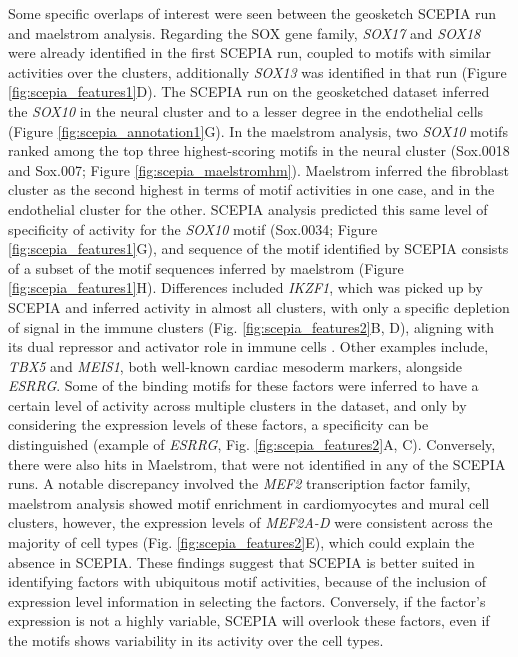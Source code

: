 Some specific overlaps of interest were seen between the geosketch SCEPIA run and maelstrom analysis. Regarding the SOX gene family,  \textit{SOX17} and \textit{SOX18} were already identified in the first SCEPIA run, coupled to motifs with similar activities over the clusters, additionally \textit{SOX13} was identified in that run (Figure \ref{fig:scepia_features1}D). The SCEPIA run on the geosketched dataset inferred the \textit{SOX10} in the neural cluster and to a lesser degree in the endothelial cells (Figure \ref{fig:scepia_annotation1}G). In the maelstrom analysis, two \textit{SOX10} motifs ranked among the top three highest-scoring motifs in the neural cluster (Sox.0018 and Sox.007; Figure \ref{fig:scepia_maelstromhm}). Maelstrom inferred the fibroblast cluster as the second highest in terms of motif activities in one case, and in the endothelial cluster for the other. SCEPIA analysis predicted this same level of specificity of activity for the \textit{SOX10} motif (Sox.0034; Figure \ref{fig:scepia_features1}G), and sequence of the motif identified by SCEPIA consists of a subset of the motif sequences inferred by maelstrom (Figure \ref{fig:scepia_features1}H). Differences included \textit{IKZF1}, which was picked up by SCEPIA and inferred activity in almost all clusters, with only a specific depletion of signal in the immune clusters (Fig. \ref{fig:scepia_features2}B, D), aligning with its dual repressor and activator role in immune cells \cite{Marke2018}. Other examples include, \textit{TBX5} and \textit{MEIS1}, both well-known cardiac mesoderm markers, alongside \textit{ESRRG}. Some of the binding motifs for these factors were inferred to have a certain level of activity across multiple clusters in the dataset, and only by considering the expression levels of these factors, a specificity can be distinguished (example of \textit{ESRRG}, Fig. \ref{fig:scepia_features2}A, C). Conversely, there were also hits in Maelstrom, that were not identified in any of the SCEPIA runs. A notable discrepancy involved the \textit{MEF2 }transcription factor family, maelstrom analysis showed motif enrichment in cardiomyocytes and mural cell clusters, however, the expression levels of \textit{MEF2A-D} were consistent across the majority of cell types (Fig. \ref{fig:scepia_features2}E), which could explain the absence in SCEPIA. These findings suggest that SCEPIA is better suited in identifying factors with ubiquitous motif activities, because of the inclusion of expression level information in selecting the factors. Conversely, if the factor's expression is not a highly variable, SCEPIA will overlook these factors, even if the motifs shows variability in its activity over the cell types.

